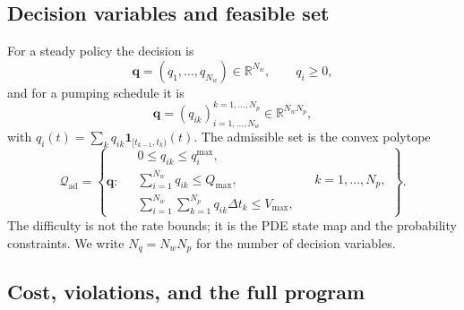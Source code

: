 \documentclass[11pt]{article}
\numberwithin{equation}{section}
\newcommand{\R}{\mathbb{R}}
\newcommand{\qq}{\mathbf{q}}
\newcommand{\ind}{\mathbf{1}}
\theoremstyle{plain}
\begin{document}
\subsection{Decision variables and feasible set}

For a steady policy the decision is
\begin{equation}
\label{eq:qsteady}
\qq=(q_1,\dots,q_{N_w})\in\R^{N_w},
\qquad q_i\ge 0,
\end{equation}
and for a pumping schedule it is
\begin{equation}
\label{eq:qpiecewise}
\qq=(q_{ik})_{i=1,\dots,N_w}^{k=1,\dots,N_p}\in\R^{N_wN_p},
\end{equation}
with $q_i(t)=\sum_k q_{ik}\ind_{[t_{k-1},t_k)}(t)$.  The admissible set is the
convex polytope
\begin{equation}
\label{eq:Qad}
\mathcal{Q}_{\mathrm{ad}}
=\left\{\qq:\
\begin{aligned}
&0\le q_{ik}\le q_i^{\max},\\
&\sum_{i=1}^{N_w}q_{ik}\le Q_{\max}, && k=1,\dots,N_p,\\
&\sum_{i=1}^{N_w}\sum_{k=1}^{N_p}q_{ik}\Delta t_k\le V_{\max},
\end{aligned}
\right\}.
\end{equation}
The difficulty is not the rate bounds; it is the PDE state map and the
probability constraints.  We write $N_q=N_wN_p$ for the number of decision
variables.

\subsection{Cost, violations, and the full program}
\end{document}
